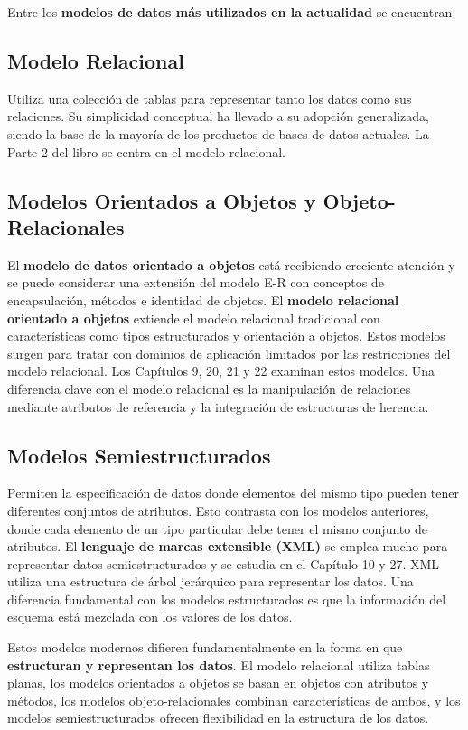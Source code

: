 Entre los \textbf{modelos de datos más utilizados en la actualidad} se encuentran:

\subsection{Modelo Relacional}

Utiliza una colección de tablas para representar tanto los datos como sus relaciones. Su simplicidad conceptual ha llevado a su adopción generalizada, siendo la base de la mayoría de los productos de bases de datos actuales. La Parte 2 del libro se centra en el modelo relacional.

\subsection{Modelos Orientados a Objetos y Objeto-Relacionales}

El \textbf{modelo de datos orientado a objetos} está recibiendo creciente atención y se puede considerar una extensión del modelo E-R con conceptos de encapsulación, métodos e identidad de objetos. El \textbf{modelo relacional orientado a objetos} extiende el modelo relacional tradicional con características como tipos estructurados y orientación a objetos. Estos modelos surgen para tratar con dominios de aplicación limitados por las restricciones del modelo relacional. Los Capítulos 9, 20, 21 y 22 examinan estos modelos. Una diferencia clave con el modelo relacional es la manipulación de relaciones mediante atributos de referencia y la integración de estructuras de herencia.

\subsection{Modelos Semiestructurados}

Permiten la especificación de datos donde elementos del mismo tipo pueden tener diferentes conjuntos de atributos. Esto contrasta con los modelos anteriores, donde cada elemento de un tipo particular debe tener el mismo conjunto de atributos. El \textbf{lenguaje de marcas extensible (XML)} se emplea mucho para representar datos semiestructurados y se estudia en el Capítulo 10 y 27. XML utiliza una estructura de árbol jerárquico para representar los datos. Una diferencia fundamental con los modelos estructurados es que la información del esquema está mezclada con los valores de los datos.

Estos modelos modernos difieren fundamentalmente en la forma en que \textbf{estructuran y representan los datos}. El modelo relacional utiliza tablas planas, los modelos orientados a objetos se basan en objetos con atributos y métodos, los modelos objeto-relacionales combinan características de ambos, y los modelos semiestructurados ofrecen flexibilidad en la estructura de los datos.

